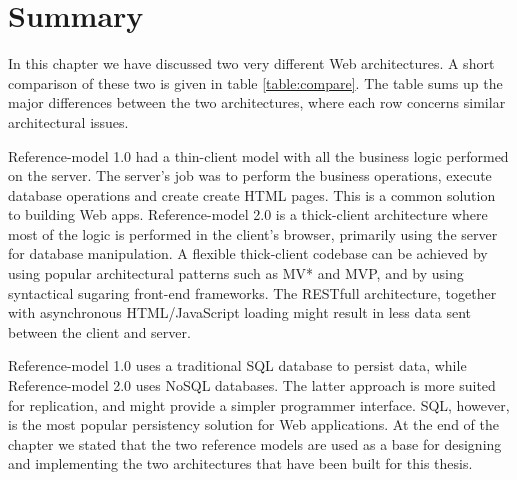 		
\section{Summary} 
In this chapter we have discussed two very different Web architectures. A short comparison of these two is given in table \ref{table:compare}. The table sums up the major differences between the two architectures, where each row concerns similar architectural issues. 

Reference-model 1.0 had a thin-client model with all the business logic performed on the server. The server's job was to perform the business operations, execute database operations and create create HTML pages. This is a common solution to building Web apps. Reference-model 2.0 is a thick-client architecture where most of the logic is performed in the client's browser, primarily using the server for database manipulation. A flexible thick-client codebase can be achieved by using popular architectural patterns such as MV* and MVP, and by using syntactical sugaring front-end frameworks. The RESTfull architecture, together with asynchronous HTML/JavaScript loading might result in less data sent between the client and server. 

Reference-model 1.0 uses a traditional SQL database to persist data, while Reference-model 2.0 uses NoSQL databases. The latter approach is more suited for replication, and might provide a simpler programmer interface. SQL, however, is the most popular persistency solution for Web applications. At the end of the chapter we stated that the two reference models are used as a base for designing and implementing the two architectures that have been built for this thesis. 
